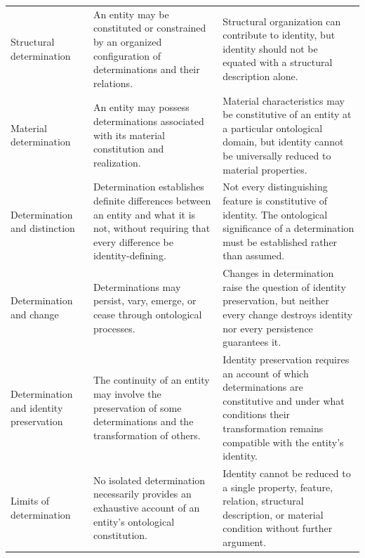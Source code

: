 \begin{table}[htbp]
\begin{tabular}{p{3.2cm} p{5.1cm} p{5.3cm}}
        Structural determination &
        An entity may be constituted or constrained by an organized configuration of determinations and their relations. &
        Structural organization can contribute to identity, but identity should not be equated with a structural description alone. \\

        Material determination &
        An entity may possess determinations associated with its material constitution and realization. &
        Material characteristics may be constitutive of an entity at a particular ontological domain, but identity cannot be universally reduced to material properties. \\

        Determination and distinction &
        Determination establishes definite differences between an entity and what it is not, without requiring that every difference be identity-defining. &
        Not every distinguishing feature is constitutive of identity. The ontological significance of a determination must be established rather than assumed. \\

        Determination and change &
        Determinations may persist, vary, emerge, or cease through ontological processes. &
        Changes in determination raise the question of identity preservation, but neither every change destroys identity nor every persistence guarantees it. \\

        Determination and identity preservation &
        The continuity of an entity may involve the preservation of some determinations and the transformation of others. &
        Identity preservation requires an account of which determinations are constitutive and under what conditions their transformation remains compatible with the entity's identity. \\

        Limits of determination &
        No isolated determination necessarily provides an exhaustive account of an entity's ontological constitution. &
        Identity cannot be reduced to a single property, feature, relation, structural description, or material condition without further argument. \\

        \hline
    \end{tabular}
\end{table}
